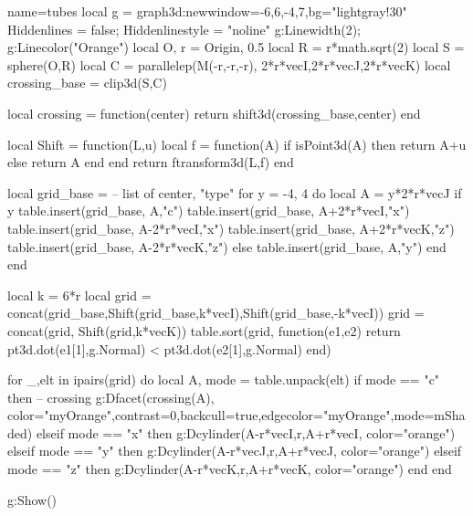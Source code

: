 \documentclass[boder=5pt]{standalone}
\begin{document}
%

\begin{luadraw}{name=tubes}
local g = graph3d:new{window={-6,6,-4,7},bg="lightgray!30" }
Hiddenlines = false; Hiddenlinestyle = "noline"
g:Linewidth(2); g:Linecolor("Orange")
local O, r = Origin, 0.5
local R  = r*math.sqrt(2)
local S = sphere(O,R)
local C = parallelep(M(-r,-r,-r), 2*r*vecI,2*r*vecJ,2*r*vecK)
local crossing_base = clip3d(S,C)

local crossing = function(center)
    return shift3d(crossing_base,center)
end

local Shift = function(L,u)
    local f = function(A)
        if isPoint3d(A) then return A+u else return A end
    end
    return ftransform3d(L,f)
end

local grid_base = {} -- list of {center, "type"}
for y = -4, 4  do
    local A = y*2*r*vecJ
    if y%
        table.insert(grid_base, {A,"c"})
        table.insert(grid_base, {A+2*r*vecI,"x"})
        table.insert(grid_base, {A-2*r*vecI,"x"})
        table.insert(grid_base, {A+2*r*vecK,"z"})
        table.insert(grid_base, {A-2*r*vecK,"z"})
    else
        table.insert(grid_base, {A,"y"})
    end
end

local k = 6*r
local grid = concat(grid_base,Shift(grid_base,k*vecI),Shift(grid_base,-k*vecI))
grid = concat(grid, Shift(grid,k*vecK))
table.sort(grid, function(e1,e2) return pt3d.dot(e1[1],g.Normal) < pt3d.dot(e2[1],g.Normal) end)

for _,elt in ipairs(grid) do
    local A, mode = table.unpack(elt)
    if mode == "c" then -- crossing
        g:Dfacet(crossing(A), {color="myOrange",contrast=0,backcull=true,edgecolor="myOrange",mode=mShaded})
    elseif mode == "x" then
        g:Dcylinder(A-r*vecI,r,A+r*vecI, {color="orange"})
    elseif mode == "y" then
        g:Dcylinder(A-r*vecJ,r,A+r*vecJ, {color="orange"})
    elseif mode == "z" then
        g:Dcylinder(A-r*vecK,r,A+r*vecK, {color="orange"})
    end
end 

g:Show()
\end{luadraw}
\end{document}

